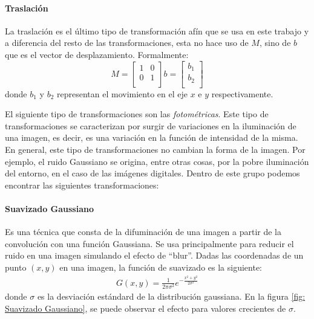 		\paragraph{Traslación}		
			
			La traslación es el último tipo de transformación afín que se usa en este trabajo y a diferencia del resto de las transformaciones, esta no hace uso de $M$, sino de $b$ que es el vector de desplazamiento. Formalmente:
			\begin{equation*}
				M =  
					\begin{bmatrix}
						1 & 0 \\
						0 & 1  \\
					\end{bmatrix}
					b =
					\begin{bmatrix}
						b_1 \\
						b_2 \\
					\end{bmatrix}	
			\end{equation*}
		donde $b_1$ y $b_2$ representan el movimiento en el eje $x$ e $y$ respectivamente.
		
	El siguiente tipo de transformaciones son las \textit{fotométricas}. Este tipo de transformaciones se caracterizan por surgir de variaciones en la iluminación de una imagen, es decir, es una variación en la función de intensidad de la misma. En general, este tipo de transformaciones no cambian la forma de la imagen. Por ejemplo, el ruido Gaussiano se origina, entre otras cosas, por la pobre iluminación del entorno, en el caso de las imágenes digitales. Dentro de este grupo podemos encontrar las siguientes transformaciones:
		
		\paragraph{Suavizado Gaussiano}
		
			Es una técnica que consta de la difuminación de una imagen a partir de la convolución con una función Gaussiana. Se usa principalmente para reducir el ruido en una imagen simulando el efecto de ``blur''. Dadas las coordenadas de un punto $(x, y)$ en una imagen, la función de suavizado es la siguiente:
			\begin{align*}
				G(x,y) = \frac{1}{2\pi\sigma^2}\textit{e}^{-\frac{x^2+y^2}{2\sigma^2}}
			\end{align*}
			donde $\sigma$ es la desviación estándard de la distribución gaussiana. En la figura \ref{fig: Suavizado Gaussiano}, se puede observar el efecto para valores crecientes de $\sigma$.
			
